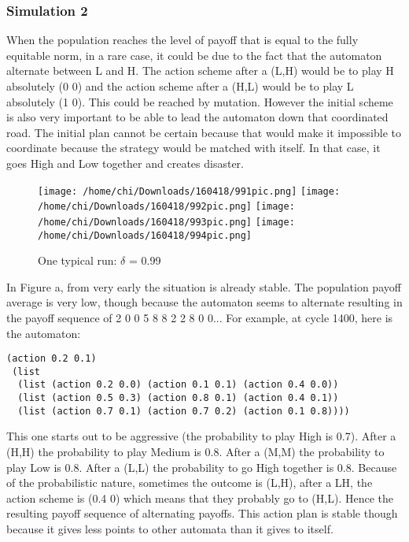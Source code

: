 \documentclass[12.5pt]{report}
\begin{document}
\subsubsection{Simulation 2}

When the population reaches the level of payoff that is equal to the fully equitable norm, in a rare case, it could be due to the fact that the automaton alternate between L and H. The action scheme after a (L,H) would be to play H absolutely (0 0) and the action scheme after a (H,L) would be to play L absolutely (1 0). This could be reached by mutation. However the initial scheme is also very important to be able to lead the automaton down that coordinated road. The initial plan cannot be certain because that would make it impossible to coordinate because the strategy would be matched with itself. In that case, it goes High and Low together and creates disaster.

\begin{figure}
\texttt{[image: /home/chi/Downloads/160418/991pic.png]}
\texttt{[image: /home/chi/Downloads/160418/992pic.png]}
\texttt{[image: /home/chi/Downloads/160418/993pic.png]}
\texttt{[image: /home/chi/Downloads/160418/994pic.png]}

\caption{One typical run: $\delta$ = 0.99}
\end{figure}

In Figure a, from very early the situation is already stable. The population payoff average is very low, though because the automaton seems to alternate resulting in the payoff sequence of 2 0 0 5 8 8 2 2 8 0 0... For example, at cycle 1400, here is the automaton:

\begin{verbatim}
(action 0.2 0.1)
 (list
  (list (action 0.2 0.0) (action 0.1 0.1) (action 0.4 0.0))
  (list (action 0.5 0.3) (action 0.8 0.1) (action 0.4 0.1))
  (list (action 0.7 0.1) (action 0.7 0.2) (action 0.1 0.8))))
\end{verbatim}

This one starts out to be aggressive (the probability to play High is 0.7). After a (H,H) the probability to play Medium is 0.8. After a (M,M) the probability to play Low is 0.8. After a (L,L) the probability to go High together is 0.8. Because of the probabilistic nature, sometimes the outcome is (L,H), after a LH, the action scheme is (0.4 0) which means that they probably go to (H,L). Hence the resulting payoff sequence of alternating payoffs. This action plan is stable though because it gives less points to other automata than it gives to itself.\\
\end{document}
